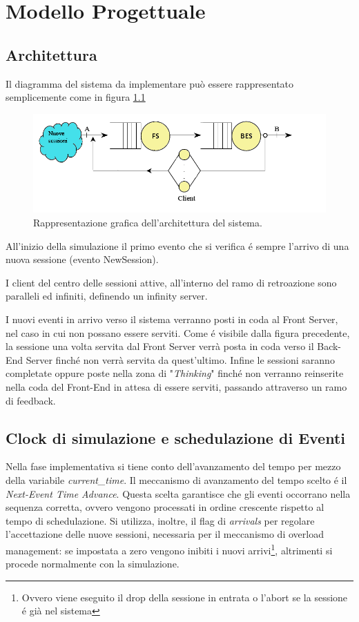 \chapter{Modello Progettuale}
	\label{cap:modelloprogettuale}

\section{Architettura}
Il diagramma del sistema da implementare pu\`o essere 
rappresentato semplicemente come in figura \ref{fig:architettura}
\begin{figure}[H]
	\centering
	\includegraphics[scale=0.7]{img/architettura.png}
	\caption[Architettura del sistema]{Rappresentazione grafica 
dell'architettura del sistema.}
	\label{fig:architettura}
	\end{figure}
All'inizio della simulazione il primo evento che si verifica \'e sempre l'arrivo 
di una nuova sessione (evento NewSession).

\vspace{0.5cm}I client del centro delle sessioni attive, all'interno del ramo di 
retroazione sono paralleli ed infiniti, definendo un infinity server.

\vspace{0.5cm}I nuovi eventi in arrivo verso il sistema verranno 
posti in coda al Front Server, nel caso in cui non possano essere serviti. Come 
\'e visibile dalla figura precedente, la sessione una volta servita dal 
Front Server verr\`a posta in coda verso il Back-End Server finch\'e non verr\`a 
servita da quest'ultimo. Infine le sessioni saranno completate oppure poste 
nella zona di "\textit{Thinking}" finch\'e non verranno reinserite nella coda 
del Front-End in attesa di essere serviti, passando attraverso un ramo di 
feedback.
 
\section{Clock di simulazione e schedulazione di  Eventi}
Nella fase implementativa si tiene conto dell'avanzamento del tempo per mezzo 
della variabile \textit{current\_time}. Il meccanismo di avanzamento del tempo 
scelto \'e il \textit{Next-Event Time Advance}. Questa scelta garantisce che gli 
eventi occorrano nella sequenza corretta, ovvero vengono processati in ordine 
crescente rispetto al tempo di schedulazione. Si utilizza, inoltre, il flag di 
\textit{arrivals} per regolare l'accettazione delle nuove sessioni, necessaria per il meccanismo di overload management: se impostata 
a zero vengono inibiti i nuovi arrivi\footnote{Ovvero viene eseguito il drop 
della sessione in entrata o l'abort se la sessione \'e gi\`a nel sistema}, 
altrimenti si procede normalmente con la simulazione.

